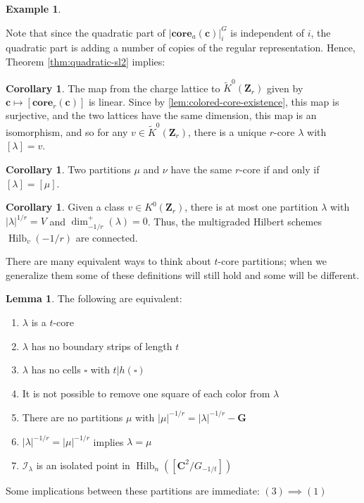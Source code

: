 \documentclass{amsart}[12pt]
\theoremstyle{definition}
\newtheorem{lemma}[dummy]{Lemma}
\newtheorem{example}[dummy]{Example}
\newtheorem{corollary}[dummy]{Corollary}
\newcommand{\Z}{\mathbf{Z}}
\newcommand{\C}{\mathbf{C}}
\newcommand{\II}{\mathcal{I}}
\newcommand{\Reg}{\mathbf{G}}
\newcommand{\core}{\mathbf{core}}
\DeclareMathOperator{\Hilb}{Hilb}
\begin{document}
\begin{example}

\end{example}



Note that since the quadratic part of $|\core_a(\mathbf{c})|^G_i$ is independent of $i$, the quadratic part is adding a number of copies of the regular representation.  Hence, Theorem \ref{thm:quadratic-sl2} implies:
\begin{corollary} 
The map from the charge lattice to $\widetilde{K}^0(\Z_r)$ given by $\mathbf{c}\mapsto [\core_r(\mathbf{c})]$ is linear.  Since by \ref{lem:colored-core-existence}, this map is surjective, and the two lattices have the same dimension, this map is an isomorphism, and so for any $v\in \widetilde{K}^0(\Z_r)$, there is a unique $r$-core $\lambda$ with $[\lambda]=v$.
\end{corollary}

\begin{corollary}
  Two partitions $\mu$ and $\nu$ have the same $r$-core if and only if $[\lambda]=[\mu]$.
\end{corollary}

\begin{corollary}
  Given a class $v\in K^0(\Z_r)$, there is at most one partition $\lambda$ with $|\lambda|^{1/r}=V$ and $\dim^+_{-1/r}(\lambda)=0$.  Thus, the multigraded Hilbert schemes $\Hilb_v(-1/r)$ are connected.
  \end{corollary}






There are many equivalent ways to think about $t$-core partitions; when we generalize them some of these definitions will still hold and some will be different.

\begin{lemma}
The following are equivalent:
\begin{enumerate}
\item $\lambda$ is a $t$-core
\item $\lambda$ has no boundary strips of length $t$
\item $\lambda$ has no cells $\square$ with $t|h(\square)$
\item It is not possible to remove one square of each color from $\lambda$
\item There are no partitions $\mu$ with $|\mu|^{-1/r}=|\lambda|^{-1/r}-\Reg$
\item $|\lambda|^{-1/r}=|\mu|^{-1/r}$ implies $\lambda=\mu$ 
\item $\II_\lambda$ is an isolated point in $\Hilb_n([\C^2/G_{-1/t}])$
\end{enumerate}


\end{lemma}
Some implications between these partitions are immediate: $(3)\implies(1)$
\end{document}

